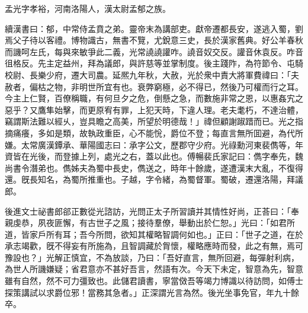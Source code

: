 
\begin{pinyinscope}
孟光字孝裕，河南洛陽人，漢太尉孟郁之族。

續漢書曰：郁，中常侍孟賁之弟。靈帝末為講部吏。獻帝遷都長安，遂逃入蜀，劉焉父子待以客禮。博物識古，無書不覽，尤銳意三史，長於漢家舊典。好公羊春秋而譏呵左氏，每與來敏爭此二義，光常譊譊讙咋。譊音奴交反。讙音休袁反。咋音徂格反。先主定益州，拜為議郎，與許慈等並掌制度。後主踐阼，為符節令、屯騎校尉、長樂少府，遷大司農。延熈九年秋，大赦，光於衆中責大將軍費禕曰：「夫赦者，偏枯之物，非明世所宜有也。衰弊窮極，必不得已，然後乃可權而行之耳。今主上仁賢，百僚稱職，有何旦夕之危，倒懸之急，而數施非常之恩，以惠姦宄之惡乎？又鷹隼始擊，而更原宥有罪，上犯天時，下違人理。老夫耄朽，不達治體，竊謂斯法難以經乆，豈具瞻之高美，所望於明德哉！」禕但顧謝踧踖而已。光之指摘痛癢，多如是類，故執政重臣，心不能恱，爵位不登；每直言無所囬避，為代所嫌。太常廣漢鐔承、華陽國志曰：承字公文，歷郡守少府。光祿勳河東裴儁等，年資皆在光後，而登據上列，處光之右，蓋以此也。傅暢裴氏家記曰：儁字奉先，魏尚書令潛弟也。儁姊夫為蜀中長史，儁送之，時年十餘歲，遂遭漢末大亂，不復得還。旣長知名，為蜀所推重也。子越，字令緒，為蜀督軍。蜀破，遷還洛陽，拜議郎。

後進文士祕書郎郤正數從光諮訪，光問正太子所習讀并其情性好尚，正荅曰：「奉親虔恭，夙夜匪懈，有古世子之風；接待羣僚，舉動出於仁恕。」光曰：「如君所道，皆家戶所有耳；吾今所問，欲知其權略智調何如也。」正曰：「世子之道，在於承志竭歡，旣不得妄有所施為，且智調藏於胷懷，權略應時而發，此之有無，焉可豫設也？」光解正慎宜，不為放談，乃曰：「吾好直言，無所回避，每彈射利病，為世人所譏嫌疑；省君意亦不甚好吾言，然語有次。今天下未定，智意為先，智意雖有自然，然不可力彊致也。此儲君讀書，寧當傚吾等竭力博識以待訪問，如傅士探策講試以求爵位邪！當務其急者。」正深謂光言為然。後光坐事免官，年九十餘卒。


\end{pinyinscope}